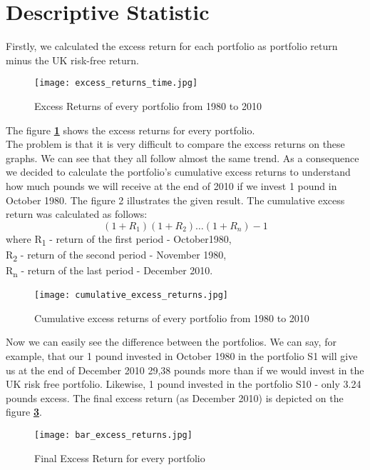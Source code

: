 \documentclass[11pt]{article}
\begin{document}
\clearpage

\section{Descriptive Statistic}
Firstly, we calculated the excess return for each portfolio as portfolio return minus the UK risk-free return.
\begin{figure}[H]
    \begin{center}
        \texttt{[image: excess\_returns\_time.jpg]}
    \end{center}
    \caption{Excess Returns of every portfolio from 1980 to 2010}
    \label{fig:excess_port}
\end{figure}
The figure \textbf{\ref{fig:excess_port}} shows the excess returns for every portfolio.\\
The problem is that it is very difficult to compare the excess returns on these graphs. We can see that they all follow almost the same trend.
As a consequence we decided to calculate the portfolio's cumulative excess returns to understand how much pounds we will receive at the end of 2010 if we invest 1 pound in October 1980. The figure 2 illustrates the given result.
The cumulative excess return was calculated as follows:
\begin{equation}
    (1 + R_1)(1 + R_2)\hdots(1 + R_n) - 1 
    \label{eq:equation_excess}
\end{equation}
where R\textsubscript{1} - return of the first period - October1980,\\
R\textsubscript{2} - return of the second period - November 1980,\\
R\textsubscript{n} - return of the last period - December 2010.

\begin{figure}[H]
    \begin{center}
        \texttt{[image: cumulative\_excess\_returns.jpg]}
    \end{center}
    \caption{Cumulative excess returns of every portfolio from 1980 to 2010}
    \label{fig:cum_excess_port}
\end{figure}

Now we can easily see the difference between the portfolios. We can say, for example, that our 1 pound invested in October 1980 in the portfolio S1 will give us at 
the end of December 2010 29,38 pounds more than if we would invest in the UK risk free portfolio. Likewise, 1 pound invested in the portfolio S10 - only 3.24 pounds excess. 
The final excess return (as December 2010) is depicted on the figure \textbf{\ref{fig:fin_excess_port}}.
\begin{figure}[H]
    \begin{center}
        \texttt{[image: bar\_excess\_returns.jpg]}
    \end{center}
    \caption{Final Excess Return for every portfolio}
    \label{fig:fin_excess_port}
\end{figure}
\end{document}
